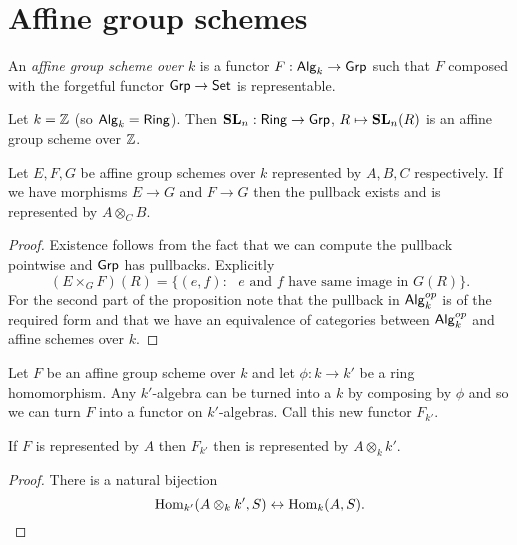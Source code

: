 \documentclass{memoir}
\begin{document}
\section{Affine group schemes}
\begin{definition}
    An \textit{affine group scheme over $k$} is a functor $F:{\normalfont\mathsf{Alg}}_k\to {\normalfont\mathsf{Grp}}$ such that $F$ composed with the forgetful functor ${\normalfont\mathsf{Grp}} \to {\normalfont\mathsf{Set}}$ is representable.
\end{definition}
\begin{example}
    Let $k = \mathbb{Z}$ (so ${\normalfont\mathsf{Alg}}_k = {\normalfont\mathsf{Ring}}$).
    Then $\mathbf{SL}_n:{\normalfont\mathsf{Ring}}\to {\normalfont\mathsf{Grp}}$, $R\mapsto \mathbf{SL}_n(R)$ is an affine group scheme over $\mathbb{Z}$.
\end{example}
\begin{proposition}
    Let $E,F,G$ be affine group schemes over $k$ represented by $A,B,C$ respectively.
    If we have morphisms $E\to G$ and $F\to G$ then the pullback exists and is represented by $A\otimes_CB$.
\end{proposition}
\begin{proof}
    Existence follows from the fact that we can compute the pullback pointwise and ${\normalfont\mathsf{Grp}}$ has pullbacks.
    Explicitly 
    \begin{equation}
        (E\times_G F)(R) = \{(e,f) : \text{ $e$ and $f$ have same image in $G(R)$}\}.
    \end{equation}
    For the second part of the proposition note that the pullback in ${\normalfont\mathsf{Alg}}_k^{op}$ is of the required form and that we have an equivalence of categories between ${\normalfont\mathsf{Alg}}_k^{op}$ and affine schemes over $k$.
\end{proof}
\begin{definition}
    Let $F$ be an affine group scheme over $k$ and let $\phi:k\to k'$ be a ring homomorphism.
    Any $k'$-algebra can be turned into a $k$ by composing by $\phi$ and so we can turn $F$ into a functor on $k'$-algebras.
    Call this new functor $F_{k'}$.
\end{definition}
\begin{proposition}
    If $F$ is represented by $A$ then $F_{k'}$ then is represented by $A\otimes_kk'$.
\end{proposition}
\begin{proof}
    There is a natural bijection 
    \begin{equation}
        \operatorname{Hom}_{k'}(A\otimes_kk',S) \leftrightarrow \operatorname{Hom}_k(A,S).
    \end{equation}
\end{proof}
\end{document}
